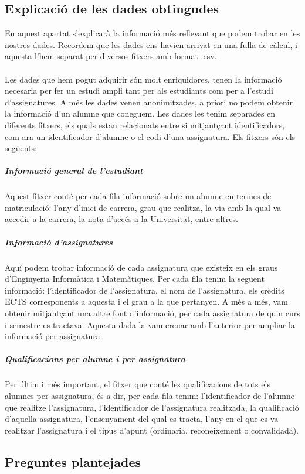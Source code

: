 \documentclass[12pt,a4paper,catalan]{article}
\begin{document}
\newpage

\subsection{Explicació de les dades obtingudes} 
En aquest apartat s'explicarà la informació més rellevant que podem trobar en les nostres dades. Recordem que les dades ens havien arrivat en una fulla de càlcul, i aquesta l'hem separat per diversos fitxers amb format .csv.
\\
\\
Les dades que hem pogut adquirir són molt enriquidores, tenen la informació necesaria per fer un estudi ampli tant per als estudiants com per a l'estudi d'assignatures. A més les dades venen anonimitzades, a priori no podem obtenir la informació d'un alumne que coneguem. Les dades les tenim separades en diferents fitxers, els quals estan relacionats entre si mitjantçant identificadors, com ara un identificador d'alumne o el codi d'una assignatura. Els fitxers són els següents:

\subparagraph{Informació general de l'estudiant}
Aquest fitxer conté per cada fila informació sobre un alumne en termes de matriculació: l'any d'inici de carrera, grau que realitza, la via amb la qual va accedir a la carrera, la nota d'accés a la Universitat, entre altres.

\subparagraph{Informació d'assignatures}
Aquí podem trobar informació de cada assignatura que existeix en els graus d'Enginyeria Informàtica i Matemàtiques. Per cada fila tenim la següent informació: l'identificador de l'assignatura, el nom de l'assignatura, els crèdits ECTS corresponents a aquesta i el grau a la que pertanyen. A més a més, vam obtenir mitjantçant una altre font d'informació, per cada assignatura de quin curs i semestre es tractava. Aquesta dada la vam creuar amb l'anterior per ampliar la informació per assignatura.

\subparagraph{Qualificacions per alumne i per assignatura}
Per últim i més important, el fitxer que conté les qualificacions de tots els alumnes per assignatura, és a dir, per cada fila tenim: l'identificador de l'alumne que realitze l'assignatura, l'identificador de l'assignatura realitzada, la qualificació d'aquella assignatura, l'ensenyament del qual es tracta, l'any en el que es va realitzar l'assignatura i el tipus d'apunt (ordinaria, reconeixement o convalidada).

\newpage

\subsection{Preguntes plantejades}
\end{document}
